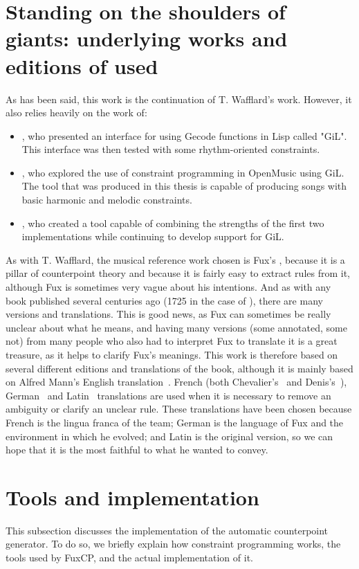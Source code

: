 \section{Standing on the shoulders of giants: underlying works and editions of \gaps used}
As has been said, this work is the continuation of T. Wafflard's work. However, it also relies heavily on the work of:
\begin{itemize}
    \item \textcite{GiLthesis}, who presented an interface for using Gecode functions in Lisp called "GiL". This interface was then tested with some rhythm-oriented constraints.
    \item \textcite{Melothesis}, who explored the use of constraint programming in OpenMusic using GiL. The tool that was produced in this thesis is capable of producing songs with basic harmonic and melodic constraints.
    \item \textcite{Melo2thesis}, who created a tool capable of combining the strengths of the first two implementations while continuing to develop support for GiL.
\end{itemize}

As with T. Wafflard, the musical reference work chosen is Fux's \gap, because it is a pillar of counterpoint theory and because it is fairly easy to extract rules from it, although Fux is sometimes very vague about his intentions. And as with any book published several centuries ago (1725 in the case of \gap), there are many versions and translations. This is good news, as Fux can sometimes be really unclear about what he means, and having many versions (some annotated, some not) from many people who also had to interpret Fux to translate it is a great treasure, as it helps to clarify Fux's meanings. This work is therefore based on several different editions and translations of the book, although it is mainly based on Alfred Mann's English translation~\cite{GaPEng}. French (both Chevalier's~\cite{GaPFrChevalier} and Denis's~\cite{GaPFrDenis}), German~\cite{GaPDe} and Latin~\cite{GapLa} translations are used when it is necessary to remove an ambiguity or clarify an unclear rule. These translations have been chosen because French is the lingua franca of the team; German is the language of Fux and the environment in which he evolved; and Latin is the original version, so we can hope that it is the most faithful to what he wanted to convey.

\section{Tools and implementation}\label{subsection:tools-and-implementation}
This subsection discusses the implementation of the automatic counterpoint generator. To do so, we briefly explain how constraint programming works, the tools used by FuxCP, and the actual implementation of it.

